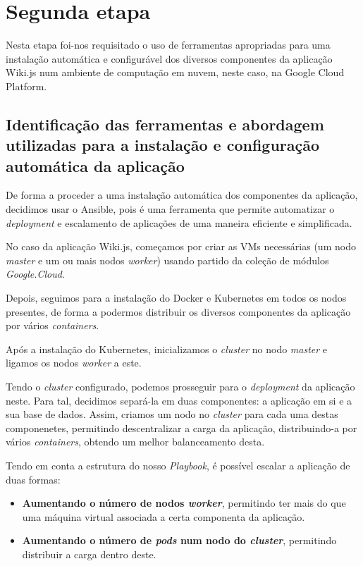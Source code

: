 \documentclass[11pt]{article}
\begin{document}
\section{Segunda etapa}

Nesta etapa foi-nos requisitado o uso de ferramentas apropriadas para uma instalação automática e configurável dos diversos componentes da aplicação Wiki.js num ambiente de computação em nuvem, neste caso, na Google Cloud Platform.

\subsection{Identificação das ferramentas e abordagem utilizadas para a instalação e configuração automática da aplicação}

De forma a proceder a uma instalação automática dos componentes da aplicação, decidimos usar o Ansible, pois é uma ferramenta que permite automatizar o \textit{deployment} e escalamento de aplicações de uma maneira eficiente e simplificada.

No caso da aplicação Wiki.js, começamos por criar as VMs necessárias (um nodo \textit{master} e um ou mais nodos \textit{worker}) usando partido da coleção de módulos \textit{Google.Cloud}.

Depois, seguimos para a instalação do Docker e Kubernetes em todos os nodos presentes, de forma a podermos distribuir os diversos componentes da aplicação por vários \textit{containers}.

Após a instalação do Kubernetes, inicializamos o \textit{cluster} no nodo \textit{master} e ligamos os nodos \textit{worker} a este.

Tendo o \textit{cluster} configurado, podemos prosseguir para o \textit{deployment} da aplicação neste. Para tal, decidimos separá-la em duas componentes: a aplicação em si e a sua base de dados. Assim, criamos um nodo no \textit{cluster} para cada uma destas componenetes, permitindo descentralizar a carga da aplicação, distribuindo-a por vários \textit{containers}, obtendo um melhor balanceamento desta.

Tendo em conta a estrutura do nosso \textit{Playbook}, é possível escalar a aplicação de duas formas:

\begin{itemize}
    \item \textbf{Aumentando o número de nodos \textit{worker}}, permitindo ter mais do que uma máquina virtual associada a certa componenta da aplicação.
    \item \textbf{Aumentando o número de \textit{pods} num nodo do \textit{cluster}}, permitindo distribuir a carga dentro deste.
\end{itemize}
\end{document}
